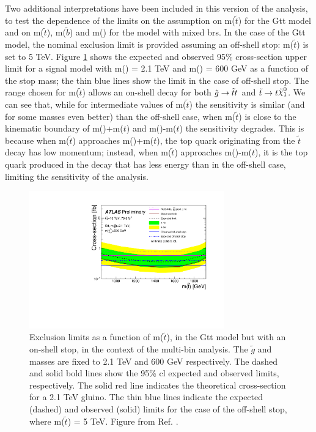 Two additional interpretations have been included in this version of the analysis, to test the dependence of the limits on the 
assumption on m($\tilde{t}$) for the Gtt model and on m($\tilde{t}$), m($\tilde{b}$) and m(\chinoonepm) for the model with mixed \glspl{br}.
In the case of the Gtt model, the nominal exclusion limit is provided assuming an off-shell stop: m($\tilde{t}$) is set to 5 TeV.
Figure \ref{fig:limits_GttOnshell} shows the expected and observed 95\% cross-section upper limit for a signal model with 
m(\gluino) = 2.1 TeV and m(\ninoone) = 600 GeV as a function of the stop mass; the thin blue lines 
show the limit in the case of off-shell stop. 
The range chosen for  m($\tilde{t}$) allows an on-shell decay for both 
$\tilde{g} \to \tilde{t}t$ and $\tilde{t} \to t \ninoone$. 
We can see that, while for intermediate values of m($\tilde{t}$) the sensitivity is similar (and for some masses even better) 
than the off-shell case, when m($\tilde{t}$) is close to the kinematic boundary of 
m(\ninoone)+m($t$) and m(\gluino)-m($t$) the sensitivity degrades. 
This is because when m($\tilde{t}$) approaches m(\ninoone)+m($t$), the top quark originating from the $\tilde{t}$ decay 
has low momentum; instead, when m($\tilde{t}$) approaches m(\gluino)-m($t$), it is the top quark produced in the \gluino 
decay that has less energy than in the off-shell case, limiting the sensitivity of the analysis. 

\begin{figure}
  \centering
  \includegraphics[width=0.75\textwidth]{figures/strong_prod/R21/multibin/Gtt_2100_600_onshell}
  \caption{Exclusion limits as a function of m($\tilde{t}$), in the Gtt model but with an on-shell stop, in the context of the multi-bin analysis. The $\tilde{g}$ and \ninoone masses are fixed to 2.1 TeV and 600 GeV respectively. The dashed and solid bold lines
    show the 95\% \gls{cl} expected and observed limits, respectively. The solid red line indicates the theoretical cross-section for a 2.1 TeV gluino. The thin blue lines indicate the expected (dashed) and observed (solid) limits for the case of the off-shell stop, where m($\tilde{t}$) = 5 TeV.
    Figure from Ref. \cite{ATLAS-CONF-2018-041}.}
  \label{fig:limits_GttOnshell}
\end{figure}

